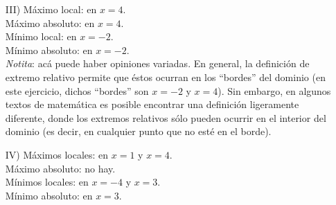 \documentclass[12pt]{article}
\begin{document}
\begin{enumerate}
\begin{enumerate}
	\item[III)]
	Máximo local: en $x = 4$.\\
	Máximo absoluto: en $x = 4$.\\
	Mínimo local: en $x = -2$.\\
	Mínimo absoluto: en $x = -2$.\\
	
	\textit{Notita}: acá puede haber opiniones variadas. En general, la definición de extremo relativo permite que éstos ocurran en los ``bordes'' del dominio (en este ejercicio, dichos ``bordes'' son $x = -2$ y $x = 4$). Sin embargo, en algunos textos de matemática es posible encontrar una definición ligeramente diferente, donde los extremos relativos sólo pueden ocurrir en el interior del dominio (es decir, en cualquier punto que no esté en el borde).
	
	\item[IV)]
	Máximos locales: en $x = 1$ y $x = 4$.\\
	Máximo absoluto: no hay.\\
	Mínimos locales: en $x = -4$ y $x = 3$.\\
	Mínimo absoluto: en $x = 3$.\\
\end{enumerate}
\end{enumerate}
\end{document}
